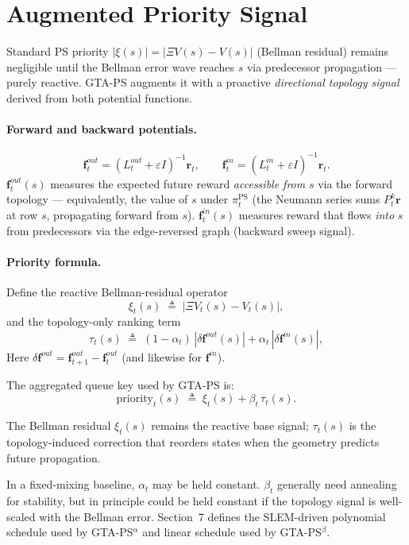 \documentclass[10pt,a4paper]{article}
\begin{document}
\section{Augmented Priority Signal}

Standard PS priority $|\xi(s)| = |\Xi V(s) - V(s)|$ (Bellman residual) remains
negligible until the Bellman error wave reaches $s$ via predecessor propagation ---
purely reactive.  GTA-PS augments it with a proactive \textit{directional topology signal}
derived from both potential functions.

\paragraph{Forward and backward potentials.}
\[
  \mathbf{f}^{out}_t = (L^{out}_t+\varepsilon I)^{-1}\mathbf{r}_t, \qquad
  \mathbf{f}^{in}_t = (L^{in}_t + \varepsilon I)^{-1}\mathbf{r}_t.
\]
$\mathbf{f}^{out}_t(s)$ measures the expected future reward \emph{accessible from} $s$
via the forward topology — equivalently, the value of $s$ under $\pi^{\mathrm{PS}}_t$
(the Neumann series sums $P_t^k\mathbf{r}$ at row $s$, propagating forward from $s$).
$\mathbf{f}^{in}_t(s)$ measures reward that flows \emph{into} $s$ from predecessors
via the edge-reversed graph (backward sweep signal).

\paragraph{Priority formula.}
Define the reactive Bellman-residual operator
\[
  \xi_t(s) \;\triangleq\; |\Xi V_t(s) - V_t(s)|,
\]
and the topology-only ranking term
\[
  \tau_t(s) \;\triangleq\; (1-\alpha_t)\,|\delta\mathbf{f}^{out}(s)| + \alpha_t\,|\delta\mathbf{f}^{in}(s)|,
\]
Here $\delta\mathbf{f}^{out} = \mathbf{f}^{out}_{t+1} - \mathbf{f}^{out}_t$ (and likewise for $\mathbf{f}^{in}$).

The aggregated queue key used by GTA-PS is:
\[
  \mathrm{priority}_t(s) \;\triangleq\; \xi_t(s) + \beta_t\,\tau_t(s).
\]

The Bellman residual $\xi_t(s)$ remains the reactive base signal; $\tau_t(s)$ is the topology-induced correction
that reorders states when the geometry predicts future propagation.


In a fixed-mixing baseline, $\alpha_t$ may be held constant. $\beta_t$ generally need annealing for stability,
but in principle could be held constant if the topology signal is well-scaled with the Bellman error.
Section~7 defines the SLEM-driven polynomial schedule used by GTA-PS$^{\alpha}$ and linear schedule used by GTA-PS$^{\beta}$.
\end{document}

